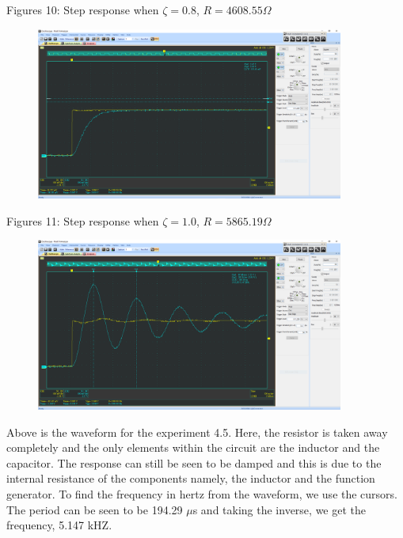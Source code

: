 \documentclass[12pt]{article}
\begin{document}
    \begin{center}
        Figures 10: Step response when $ \zeta = 0.8 $, $ R = 4608.55 \Omega $
    \end{center}
    \begin{figure}[h]
        \centering
        \includegraphics[width=0.9\textwidth]{4.4 (1.0).png}
    \end{figure}
    \begin{center}
        Figures 11: Step response when $ \zeta = 1.0 $, $ R = 5865.19 \Omega $
    \end{center}
    \newpage
    \begin{figure}[h]
        \centering
        \includegraphics[width=0.9\textwidth]{4.5.png}
    \end{figure}
    \par Above is the waveform for the experiment 4.5. Here, the resistor is taken away completely and the only elements within the circuit are the inductor and the capacitor. The response can still be seen to be damped and this is due to the internal resistance of the components namely, the inductor and the function generator. To find the frequency in hertz from the waveform, we use the cursors. The period can be seen to be 194.29 $ \mu $s and taking the inverse, we get the frequency, 5.147 kHZ.
\end{document}
